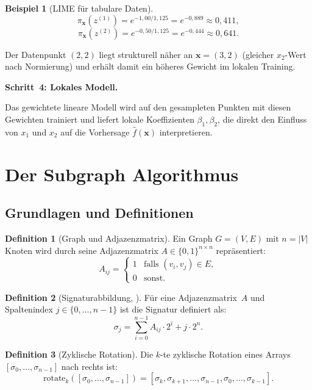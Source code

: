 ﻿\documentclass[a4paper,12pt]{article}
\theoremstyle{definition}
\newtheorem{definition}{Definition}[section]
\newtheorem{beispiel}{Beispiel}[section]
\begin{document}
\begin{beispiel}[LIME für tabulare Daten]
  \[
    \pi_\mathbf{x}(z^{(1)}) = e^{-1{,}00/1{,}125} = e^{-0{,}889} \approx 0{,}411,
  \]
  \[
    \pi_\mathbf{x}(z^{(2)}) = e^{-0{,}50/1{,}125} = e^{-0{,}444} \approx 0{,}641.
  \]

  Der Datenpunkt $(2, 2)$ liegt strukturell näher an $\mathbf{x} = (3, 2)$ (gleicher
  $x_2$-Wert nach Normierung) und erhält damit ein höheres Gewicht im lokalen Training.

  \textbf{Schritt~4: Lokales Modell.}

  Das gewichtete lineare Modell wird auf den gesampleten Punkten mit diesen Gewichten
  trainiert und liefert lokale Koeffizienten $\beta_1, \beta_2$, die direkt den Einfluss
  von $x_1$ und $x_2$ auf die Vorhersage $\hat{f}(\mathbf{x})$ interpretieren.
\end{beispiel}

\section{Der Subgraph Algorithmus}

\subsection{Grundlagen und Definitionen}

\begin{definition}[Graph und Adjazenzmatrix]
  Ein Graph $G = (V, E)$ mit $n = |V|$ Knoten wird durch seine Adjazenzmatrix
  $A \in \{0,1\}^{n \times n}$ repräsentiert:
  \[
    A_{ij} = \begin{cases}
      1 & \text{falls } (v_i, v_j) \in E, \\
      0 & \text{sonst.}
    \end{cases}
  \]
\end{definition}

\begin{definition}[Signaturabbildung, \citealt{Epp2026}]
  Für eine Adjazenzmatrix~$A$ und Spaltenindex $j \in \{0,\ldots,n-1\}$ ist die
  Signatur definiert als:
  \begin{equation}
    \sigma_j = \sum_{i=0}^{n-1} A_{ij} \cdot 2^i + j \cdot 2^n.
    \label{eq:signature}
  \end{equation}
\end{definition}

\begin{definition}[Zyklische Rotation]
  Die $k$-te zyklische Rotation eines Arrays $[\sigma_0, \ldots, \sigma_{n-1}]$
  nach rechts ist:
  \[
    \mathrm{rotate}_k([\sigma_0,\ldots,\sigma_{n-1}])
    = [\sigma_k, \sigma_{k+1}, \ldots, \sigma_{n-1}, \sigma_0, \ldots, \sigma_{k-1}].
  \]
\end{definition}
\end{document}
